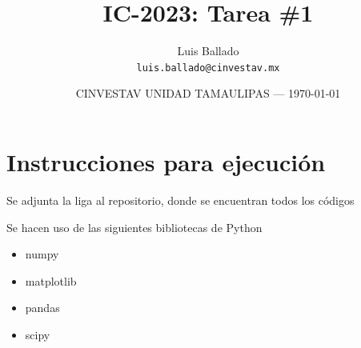 \documentclass{article}
\title{IC-2023: Tarea \#1} %
\author{Luis Ballado\\ \texttt{luis.ballado@cinvestav.mx}} %
\date{CINVESTAV UNIDAD TAMAULIPAS --- \today} %
\begin{document}
\maketitle %


\section{Instrucciones para ejecución}

\begin{info} %
  Se adjunta la liga al repositorio, donde se encuentran todos los códigos\\
\end{info}

\begin{info} %
  Se hacen uso de las siguientes bibliotecas de Python
  \begin{itemize}
  \item numpy
  \item matplotlib
  \item pandas
  \item scipy
  \end{itemize}
\end{info}
\end{document}
